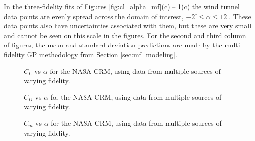 In the three-fidelity fits of Figures \ref{fig:cl_alpha_mf}(c) -- \ref{fig:cm_alpha_mf}(c) the wind tunnel data points are evenly spread across the domain of interest, $-2^\circ \leq \alpha \leq 12^\circ$. These data points also have uncertainties associated with them, but these are very small and cannot be seen on this scale in the figures. For the second and third column of figures, the mean and standard deviation predictions are made by the multi-fidelity GP methodology from Section \ref{sec:mf_modeling}. 

\begin{figure}
    \centering
    \begin{subfigure}[Single fidelity fit.] {
        \texttt{[image: images/cl\_1f.eps]} }
    \end{subfigure}
    \hfill
    \begin{subfigure}[Two-fidelity fit.]{
        \texttt{[image: images/cl\_2f.eps]} 
    }
    \end{subfigure}
    \hfill
    \begin{subfigure}[Three-fidelity fit.]{
        \texttt{[image: images/cl\_3f.eps]} 
    }
    \end{subfigure}
    \caption{$C_L$ vs $\alpha$ for the NASA CRM, using data from multiple sources of varying fidelity.\label{fig:cl_alpha_mf}}
    \hfill
    \centering
    \begin{subfigure}[Single fidelity fit.] {
        \texttt{[image: images/cd\_1f.eps]} }
    \end{subfigure}
    \hfill
    \begin{subfigure}[Two-fidelity fit.]{
        \texttt{[image: images/cd\_2f.eps]} 
    }
    \end{subfigure}
    \hfill
    \begin{subfigure}[Three-fidelity fit.]{
        \texttt{[image: images/cd\_3f.eps]} 
    }
    \end{subfigure}
    \caption{$C_D$ vs $\alpha$ for the NASA CRM, using data from multiple sources of varying fidelity.\label{fig:cd_alpha_mf}}
    \hfill
    \centering
    \begin{subfigure}[Single fidelity fit.] {
        \texttt{[image: images/cm\_1f.eps]} }
    \end{subfigure}
    \hfill
    \begin{subfigure}[Two-fidelity fit.]{
        \texttt{[image: images/cm\_2f.eps]} 
    }
    \end{subfigure}
    \hfill
    \begin{subfigure}[Three-fidelity fit.]{
        \texttt{[image: images/cm\_3f.eps]} 
    }
    \end{subfigure}
    \caption{$C_m$ vs $\alpha$ for the NASA CRM, using data from multiple sources of varying fidelity.\label{fig:cm_alpha_mf}}
\end{figure}

